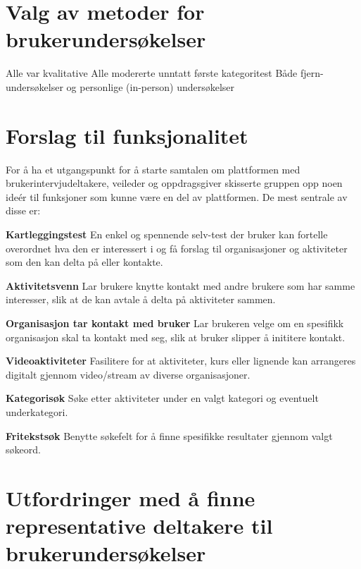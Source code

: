 \section{Valg av metoder for brukerundersøkelser}
Alle var kvalitative
Alle modererte unntatt første kategoritest
Både fjern-undersøkelser og personlige (in-person) undersøkelser


\section{Forslag til funksjonalitet}
\label{section:funkForslag}
For å ha et utgangspunkt for å starte samtalen om plattformen med brukerintervjudeltakere, veileder og oppdragsgiver skisserte gruppen opp noen ideér til funksjoner som kunne være en del av plattformen. De mest sentrale av disse er:\newline

\begin{compactitem}
\item[{\bf Kartleggingstest}] En enkel og spennende selv-test der bruker kan fortelle overordnet hva den er interessert i og få forslag til organisasjoner og aktiviteter som den kan delta på eller kontakte.
\item[{\bf Aktivitetsvenn}] Lar brukere knytte kontakt med andre brukere som har samme interesser, slik at de kan avtale å delta på aktiviteter sammen.
\item[{\bf Organisasjon tar kontakt med bruker}] Lar brukeren velge om en spesifikk organisasjon skal ta kontakt med seg, slik at bruker slipper å inititere kontakt.
\item[{\bf Videoaktiviteter}] Fasilitere for at aktiviteter, kurs eller lignende kan arrangeres digitalt gjennom video/stream av diverse organisasjoner.
\item[{\bf Kategorisøk}] Søke etter aktiviteter under en valgt kategori og eventuelt underkategori.
\item[{\bf Fritekstsøk}] Benytte søkefelt for å finne spesifikke resultater gjennom valgt søkeord.
\end{compactitem}

\section{Utfordringer med å finne representative deltakere til brukerundersøkelser}


